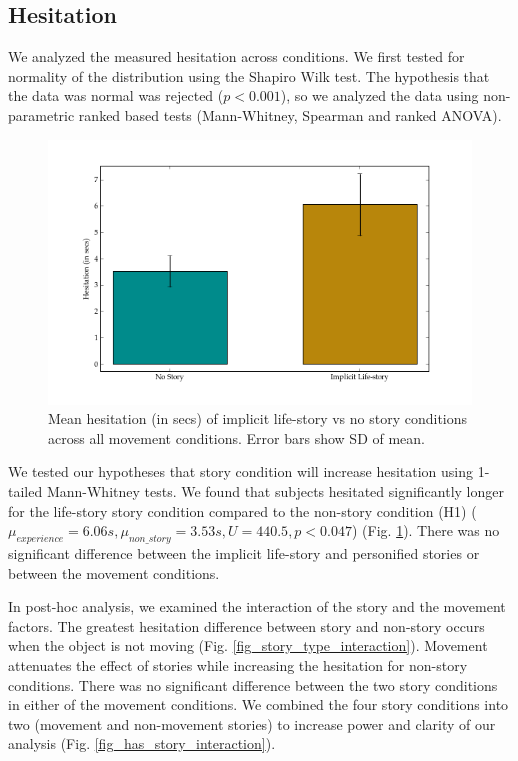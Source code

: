  \subsection{Hesitation}

We analyzed the measured hesitation across conditions. We first tested for normality of the distribution using the Shapiro Wilk test. The hypothesis that the data was normal was rejected ($p < 0.001$), so we analyzed the data using non-parametric ranked based tests (Mann-Whitney, Spearman and ranked ANOVA). 




   \begin{figure}[thpb]
      \centering
      \includegraphics[width=4.6in]{figures/hexbug/story_hesitation.png}
      \caption{Mean hesitation (in secs) of implicit life-story vs no story conditions across all movement conditions. Error bars show SD of mean.}
      \label{fig_story_hesitation}
   \end{figure}
   



We tested our hypotheses that story condition will increase hesitation using 1-tailed Mann-Whitney tests.  We found that subjects hesitated significantly longer for the life-story story condition compared to the non-story condition (H1) ($\mu_{experience}=6.06s, \mu_{non\_story}=3.53s, U=440.5, p<0.047$) (Fig. \ref{fig_story_hesitation}). There was no significant difference between the implicit life-story and personified stories or between the movement conditions.



In post-hoc analysis, we examined the interaction of the story and the movement factors. The greatest hesitation difference between story and non-story occurs when the object is not moving (Fig. \ref{fig_story_type_interaction}). Movement attenuates the effect of stories while increasing the hesitation for non-story conditions. There was no significant difference between the two story conditions in either of the movement conditions. We combined the four story conditions into two (movement and non-movement stories) to increase power and clarity of our analysis (Fig. \ref{fig_has_story_interaction}).




